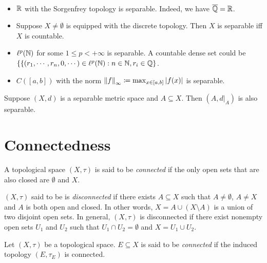 \documentclass{techreport}
\begin{document}
\begin{example}\label{Exa:SeparableSpaces}\
	\begin{itemize}
		\item $\mathbb{R}$ with the Sorgenfrey topology is separable. Indeed, we have $\overline{\mathbb{Q}} = \mathbb{R}$.
		\item Suppose $X \neq \emptyset$ is equipped with the discrete topology.
		Then $X$ is separable iff $X$ is countable.
		\item $\ell^p(\mathbb{N})$ for some $1 \le p < +\infty$ is separable.
		A countable dense set could be $\{  \{ (r_1,\cdots,r_n,0,\cdots) \in \ell^p(\mathbb{N}) : n \in \mathbb{N}, r_i \in \mathbb{Q} \}$.
		\item $C([a,b])$ with the norm $\left\|{f}\right\|_\infty \coloneqq \max_{x \in [a,b]} \left|{f(x)}\right|$ is separable.
	\end{itemize}
\end{example}

\begin{proposition}\label{Prop:SeparableMetricInduceSeparable}
	Suppose $(X,d)$ is a separable metric space and $A \subseteq X$.
	Then $(A,d|_A)$ is also separable.
\end{proposition}

\section{Connectedness}

\begin{definition}\label{De:ConnectedSpace}
	A topological space $(X,\tau)$ is said to be \emph{connected} if the only open sets that are also closed are $\emptyset$ and $X$.
\end{definition}

\begin{remark}\label{Rem:SplitDisconnectedSpace}
	$(X,\tau)$ said to be is \emph{disconnected} if there exists $A \subseteq X$ such that $A \neq \emptyset$, $A \neq X$ and $A$ is both open and closed.
	In other words, $X = A \cup (X \setminus A)$ is a union of two disjoint open sets.
	In general, $(X,\tau)$ is disconnected if there exist nonempty open sets $U_1$ and $U_2$ such that $U_1 \cap U_2 = \emptyset$ and $X = U_1 \cup U_2$.
\end{remark}

\begin{definition}\label{De:ConnectedSet}
	Let $(X,\tau)$ be a topological space.
	$E \subseteq X$ is said to be \emph{connected} if the induced topology $(E,\tau_E)$ is connected.
\end{definition}
\end{document}
